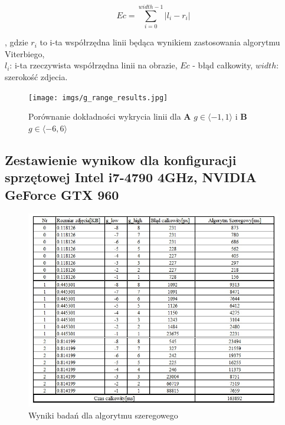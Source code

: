 \documentclass[document.tex]{subfiles}
\begin{document}
\begin{equation}
   Ec = \sum_{i=0}^{width - 1} |l_i - r_i|
    \label{eq:total_error}
\end{equation}

, gdzie $r_i$ to i-ta współrzędna linii będąca wynikiem zastosowania algorytmu Viterbiego, 
\\$l_i$: i-ta rzeczywista współrzędna linii na obrazie, $Ec$ - błąd całkowity, 
$width$: szerokość zdjecia.

\begin{figure}[h]
\texttt{[image: imgs/g\_range\_results.jpg]}
\caption{Porównanie dokładności wykrycia linii dla \textbf{A} $g\in \langle -1, 1 \rangle$ i 
\textbf{B} $g\in \langle -6, 6 \rangle$}
\label{fig:g_range_results}
\end{figure}

\clearpage
\subsection{Zestawienie wynikow dla konfiguracji sprzętowej 
Intel i7-4790 4GHz, NVIDIA GeForce GTX 960}


\begin{figure}[h]
\includegraphics[scale=0.75]{imgs/results_pc_serial}
\caption{Wyniki badań dla algorytmu szeregowego}
\label{fig:results_pc_serial}
\end{figure}
\end{document}
